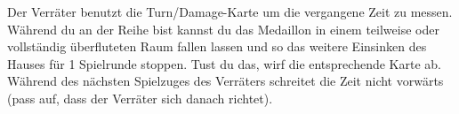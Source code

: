 Der Verräter benutzt die Turn/Damage-Karte um die vergangene Zeit zu messen. Während du an der Reihe bist kannst du das Medaillon in einem teilweise oder vollständig überfluteten Raum fallen lassen und so das weitere Einsinken des Hauses für 1 Spielrunde stoppen. Tust du das, wirf die entsprechende Karte ab. Während des nächsten Spielzuges des Verräters schreitet die Zeit nicht vorwärts (pass auf, dass der Verräter sich danach richtet).


